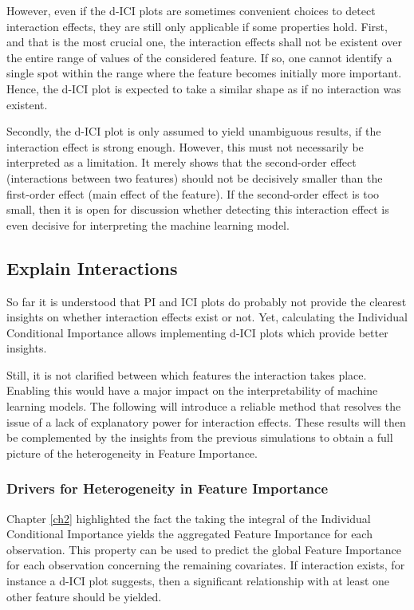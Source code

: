 \documentclass[
]{krantz}
\begin{document}
However, even if the d-ICI plots are sometimes convenient choices to detect interaction effects, they are still only applicable if some properties hold. First, and that is the most crucial one, the interaction effects shall not be existent over the entire range of values of the considered feature. If so, one cannot identify a single spot within the range where the feature becomes initially more important. Hence, the d-ICI plot is expected to take a similar shape as if no interaction was existent.

Secondly, the d-ICI plot is only assumed to yield unambiguous results, if the interaction effect is strong enough. However, this must not necessarily be interpreted as a limitation. It merely shows that the second-order effect (interactions between two features) should not be decisively smaller than the first-order effect (main effect of the feature). If the second-order effect is too small, then it is open for discussion whether detecting this interaction effect is even decisive for interpreting the machine learning model.

\pagebreak

\hypertarget{ch32}{%
\subsection{Explain Interactions}\label{ch32}}

So far it is understood that PI and ICI plots do probably not provide the clearest insights on whether interaction effects exist or not. Yet, calculating the Individual Conditional Importance allows implementing d-ICI plots which provide better insights.

Still, it is not clarified between which features the interaction takes place. Enabling this would have a major impact on the interpretability of machine learning models. The following will introduce a reliable method that resolves the issue of a lack of explanatory power for interaction effects. These results will then be complemented by the insights from the previous simulations to obtain a full picture of the heterogeneity in Feature Importance.

\hypertarget{ch321}{%
\subsubsection{Drivers for Heterogeneity in Feature Importance}\label{ch321}}

Chapter \ref{ch2} highlighted the fact the taking the integral of the Individual Conditional Importance yields the aggregated Feature Importance for each observation. This property can be used to predict the global Feature Importance for each observation concerning the remaining covariates. If interaction exists, for instance a d-ICI plot suggests, then a significant relationship with at least one other feature should be yielded.
\end{document}

